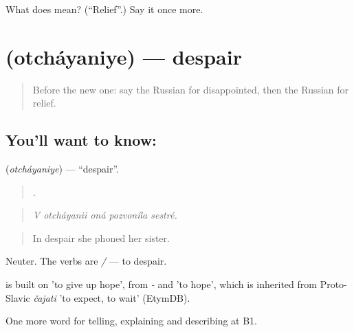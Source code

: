 \begin{tcolorbox}[breakable,colback=teal!4,colframe=teal!35!black,title={Before you move on}]
What does  mean? (\textquotedblleft{}Relief\textquotedblright{}.) Say it once more.
\end{tcolorbox}
\section[\texorpdfstring{\ru{отчаяние} (otcháyaniye)}{отчаяние (otcháyaniye)}]{ (otcháyaniye) — despair}

\label{lesson:RU-C473-otchayaniye}



\begin{quote}
Before the new one: say the Russian for disappointed, then the Russian for relief.
\end{quote}

\subsection*{You'll want to know: }
\textbf{} (\emph{otcháyaniye}) — \textquotedblleft{}despair\textquotedblright{}.

\begin{quote}
    .
\end{quote}

\begin{quote}
\emph{V otcháyanii oná pozvoníla sestré.}
\end{quote}

\begin{quote}
In despair she phoned her sister.
\end{quote}

Neuter. The verbs are \emph{ / } — to despair.

\begin{cousinweb}
\emph{} is built on \emph{} 'to give up hope', from \emph{-} and \emph{} 'to hope', which is inherited from Proto-Slavic \emph{čajati} 'to expect, to wait' (EtymDB).
\end{cousinweb}

\begin{grammarlens}[title={What you've built}]
One more word for telling, explaining and describing at B1.
\end{grammarlens}


